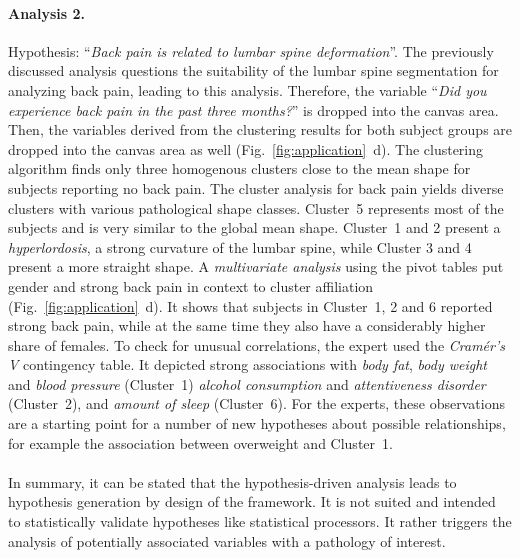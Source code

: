 \documentclass[journal]{style/vgtc} 			          %
\begin{document}
\paragraph{Analysis 2.}
Hypothesis: ``\emph{Back pain is related to lumbar spine deformation}''.
%
The previously discussed analysis questions the suitability of the lumbar spine segmentation for analyzing back pain, leading to this analysis.
%
Therefore, the variable ``\emph{Did you experience back pain in the past three months?}'' is dropped into the canvas area. %
%
Then, the variables derived from the clustering results for both subject groups are dropped into the canvas area as well (Fig.~\ref{fig:application}~d).
%
The clustering algorithm finds only three homogenous clusters close to the mean shape for subjects reporting no back pain.
%
The cluster analysis for back pain yields diverse clusters with various pathological shape classes.
%
Cluster~5 represents most of the subjects and is very similar to the global mean shape.
%
Cluster~1 and 2 present a \emph{hyperlordosis}, a strong curvature of the lumbar spine, while Cluster 3 and 4 present a more straight shape.
%
A \emph{multivariate analysis} using the pivot tables put gender and strong back pain in context to cluster affiliation (Fig.~\ref{fig:application}~d). 
%
It shows that subjects in Cluster~1, 2 and 6 reported strong back pain, while at the same time they also have a considerably higher share of females.
%
To check for unusual correlations, the expert used the \emph{Cram\'{e}r's V} contingency table.
%
It depicted strong associations with \emph{body fat}, \emph{body weight} and \emph{blood pressure} (Cluster~1) \emph{alcohol consumption} and \emph{attentiveness disorder} (Cluster~2), and \emph{amount of sleep} (Cluster~6).
%
For the experts, these observations are a starting point for a number of new hypotheses about possible relationships, for example the association between overweight and Cluster~1.
%
\\\\
In summary, it can be stated that the hypothesis-driven analysis leads to hypothesis generation by design of the framework.
%
It is not suited and intended to statistically validate hypotheses like statistical processors.
%
It rather triggers the analysis of potentially associated variables with a pathology of interest.
%
\end{document}
